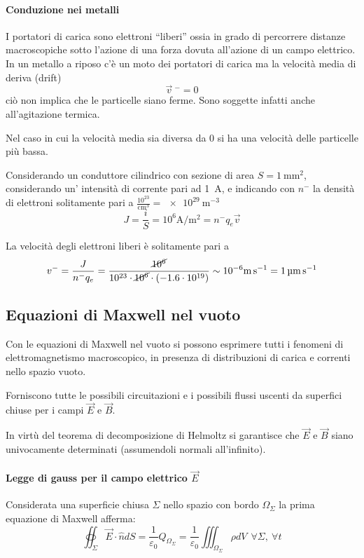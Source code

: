 \paragraph{Conduzione nei metalli}
I portatori di carica sono elettroni ``liberi'' ossia in grado di percorrere distanze
macroscopiche sotto l'azione di una forza dovuta all'azione di un campo elettrico.
In un metallo a riposo c'è un moto dei portatori di carica ma la velocità media di deriva (drift)
$$
\vec{v}\ ^- = 0
$$
ciò non implica che le particelle siano ferme. Sono soggette infatti anche all'agitazione termica.

Nel caso in cui la velocità media sia diversa da 0 si ha una velocità delle particelle più bassa.

Considerando un conduttore cilindrico con sezione di area $S=\SI{1}{\milli\meter^2}$, considerando un'
intensità di corrente pari ad \SI{1}{\ampere}, e indicando con $n^-$ la densità di elettroni
solitamente pari a $\frac{10^{23}}{\si{\centi\meter}^3} = \SI{e29}{\meter^{-3}}$
$$
J = \frac{i}{S} = 10^6\si{\ampere\per\meter^2} = n^-q_e\vec{v}
$$

La velocità degli elettroni liberi è solitamente pari a
$$
v^- = \frac{J}{n^-q_e} =  \frac{\cancel{10^6}}{10^{23}\cdot\cancel{10^6}\cdot (-1.6\cdot10^{19})} \sim 10^{-6} \si{\meter\per\second} = \SI{1}{\micro\meter\per\second}
$$

\subsection{Equazioni di Maxwell nel vuoto}
Con le equazioni di Maxwell nel vuoto si possono esprimere tutti i fenomeni di elettromagnetismo macroscopico, in 
presenza di distribuzioni di carica e correnti nello spazio vuoto.

Forniscono tutte le possibili circuitazioni e i possibili flussi uscenti da superfici chiuse per i campi
$\vec{E}$ e $\vec{B}$.

In virtù del teorema di decomposizione di Helmoltz si garantisce che $\vec{E}$ e $\vec{B}$ 
siano univocamente determinati (assumendoli normali all'infinito).

\paragraph{Legge di gauss per il campo elettrico $\vec{E}$}
Considerata una superficie chiusa $\Sigma$ nello spazio con bordo $\Omega_\Sigma$
la prima equazione di Maxwell afferma: 
\begin{equation}
\label{eq:legge_gauss}
\oiint_\Sigma \vec{E}\cdot\hat{n}dS = \frac{1}{\varepsilon_0}Q_{\Omega_\Sigma} = \frac{1}{\varepsilon_0}
\iiint_{\Omega_\Sigma} \rho dV \ \ \forall \Sigma,\ \forall t
\end{equation}

